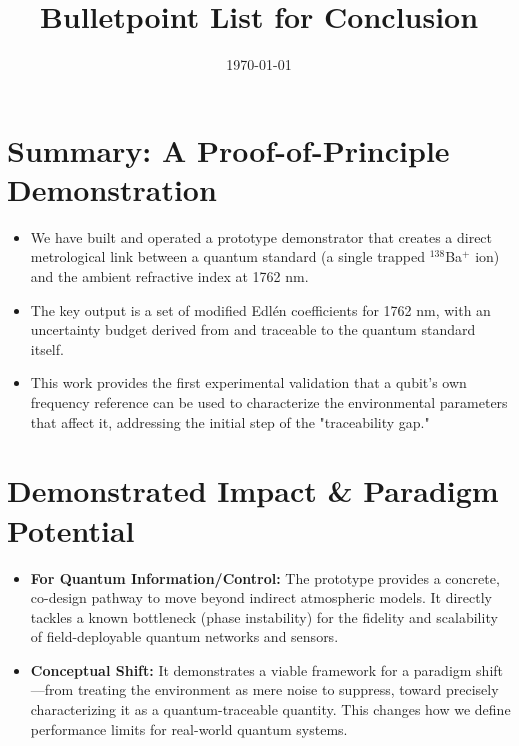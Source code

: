 \documentclass[aip,reprint,groupedaddress,onecolumn,superscriptaddress]{revtex4-2}
\begin{document}
\title{Bulletpoint List for Conclusion}
\date{\today}

\maketitle

\section{Summary: A Proof-of-Principle Demonstration}
\begin{itemize}
    \item We have built and operated a prototype demonstrator that creates a direct metrological link between a quantum standard (a single trapped $^{138}$Ba$^+$ ion) and the ambient refractive index at 1762 nm.
    \item The key output is a set of modified Edlén coefficients for 1762 nm, with an uncertainty budget derived from and traceable to the quantum standard itself.
    \item This work provides the first experimental validation that a qubit's own frequency reference can be used to characterize the environmental parameters that affect it, addressing the initial step of the "traceability gap."
\end{itemize}

\section{Demonstrated Impact \& Paradigm Potential}
\begin{itemize}
    \item \textbf{For Quantum Information/Control:} The prototype provides a concrete, co-design pathway to move beyond indirect atmospheric models. It directly tackles a known bottleneck (phase instability) for the fidelity and scalability of field-deployable quantum networks and sensors.
    \item \textbf{Conceptual Shift:} It demonstrates a viable framework for a paradigm shift—from treating the environment as mere noise to suppress, toward precisely characterizing it as a quantum-traceable quantity. This changes how we define performance limits for real-world quantum systems.
\end{itemize}
\end{document}
